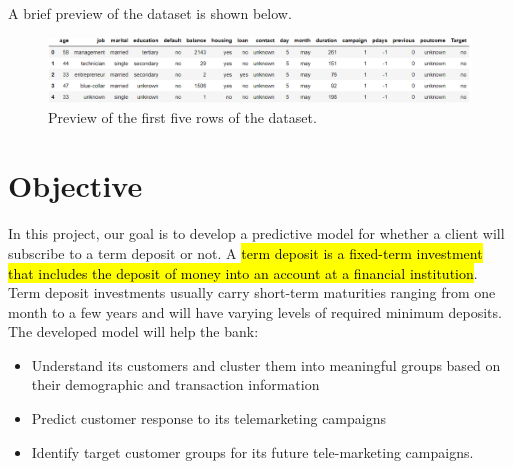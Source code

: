 A brief preview of the dataset is shown below.

\begin{figure}[tb]
\centering
\includegraphics[width = 0.8\hsize]{./resources/img/df_head.png}
\caption{Preview of the first five rows of the dataset.} %
\label{fig:balance}
\end{figure}



\section{Objective}
In this project, our goal is to develop a predictive model for whether a client will subscribe to a term deposit or not. A \hl{term deposit is a fixed-term investment that includes the deposit of money into an account at a financial institution}. Term deposit investments usually carry short-term maturities ranging from one month to a few years and will have varying levels of required minimum deposits.
The developed model will help the bank:
\begin{itemize}
\item Understand its customers and cluster them into meaningful groups  based on their demographic and transaction information
\item Predict customer response to its telemarketing campaigns
\item Identify target customer groups for its future tele-marketing campaigns.
\end{itemize}








